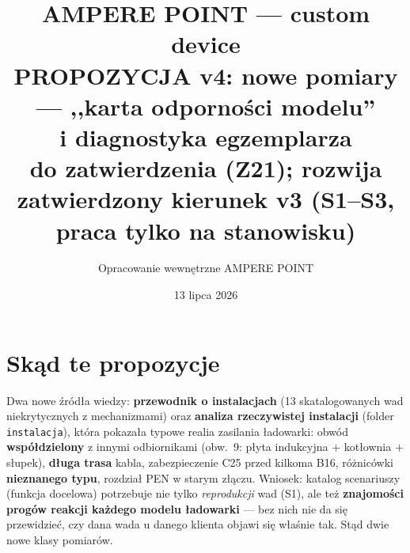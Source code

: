 \documentclass[11pt,a4paper]{article}
\title{\textbf{AMPERE POINT --- custom device}\\[4pt]
\large PROPOZYCJA v4: nowe pomiary --- ,,karta odporności modelu''\\ i diagnostyka egzemplarza\\[2pt]
\normalsize do zatwierdzenia (Z21); rozwija zatwierdzony kierunek v3 (S1--S3, praca tylko na stanowisku)}
\author{Opracowanie wewnętrzne AMPERE POINT}
\date{13 lipca 2026}
\begin{document}
\maketitle
\vspace{-1.4em}

\section{Skąd te propozycje}
Dwa nowe źródła wiedzy: \textbf{przewodnik o instalacjach} (13 skatalogowanych wad niekrytycznych
z mechanizmami) oraz \textbf{analiza rzeczywistej instalacji} (folder \texttt{instalacja}), która
pokazała typowe realia zasilania ładowarki: obwód \textbf{współdzielony} z innymi odbiornikami
(obw.~9: płyta indukcyjna $+$ kotłownia $+$ słupek), \textbf{długa trasa} kabla, zabezpieczenie
C25 przed kilkoma B16, różnicówki \textbf{nieznanego typu}, rozdział PEN w starym złączu.
Wniosek: katalog scenariuszy (funkcja docelowa) potrzebuje nie tylko \emph{reprodukcji} wad (S1),
ale też \textbf{znajomości progów reakcji każdego modelu ładowarki} --- bez nich nie da się
przewidzieć, czy dana wada u danego klienta objawi się właśnie tak. Stąd dwie nowe klasy pomiarów.
\end{document}
